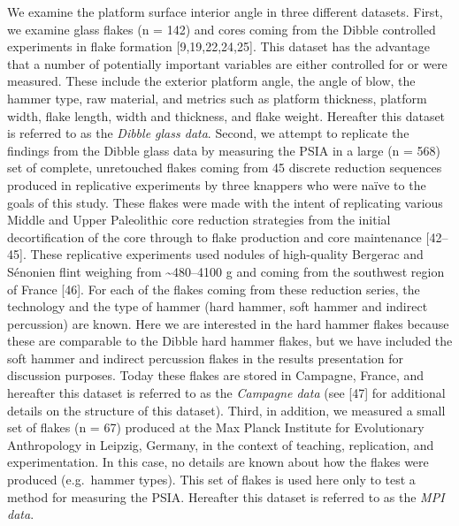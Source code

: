 \documentclass[10pt,letterpaper]{article}
\begin{document}
We examine the platform surface interior angle in three different
datasets. First, we examine glass flakes (n = 142) and cores coming from
the Dibble controlled experiments in flake formation
{[}9,19,22,24,25{]}. This dataset has the advantage that a number of
potentially important variables are either controlled for or were
measured. These include the exterior platform angle, the angle of blow,
the hammer type, raw material, and metrics such as platform thickness,
platform width, flake length, width and thickness, and flake weight.
Hereafter this dataset is referred to as the \emph{Dibble glass data}.
Second, we attempt to replicate the findings from the Dibble glass data
by measuring the PSIA in a large (n = 568) set of complete, unretouched
flakes coming from 45 discrete reduction sequences produced in
replicative experiments by three knappers who were naïve to the goals of
this study. These flakes were made with the intent of replicating
various Middle and Upper Paleolithic core reduction strategies from the
initial decortification of the core through to flake production and core
maintenance {[}42--45{]}. These replicative experiments used nodules of
high-quality Bergerac and Sénonien flint weighing from
\textasciitilde480--4100 g and coming from the southwest region of
France {[}46{]}. For each of the flakes coming from these reduction
series, the technology and the type of hammer (hard hammer, soft hammer
and indirect percussion) are known. Here we are interested in the hard
hammer flakes because these are comparable to the Dibble hard hammer
flakes, but we have included the soft hammer and indirect percussion
flakes in the results presentation for discussion purposes. Today these
flakes are stored in Campagne, France, and hereafter this dataset is
referred to as the \emph{Campagne data} (see {[}47{]} for additional
details on the structure of this dataset). Third, in addition, we
measured a small set of flakes (n = 67) produced at the Max Planck
Institute for Evolutionary Anthropology in Leipzig, Germany, in the
context of teaching, replication, and experimentation. In this case, no
details are known about how the flakes were produced (e.g.~hammer
types). This set of flakes is used here only to test a method for
measuring the PSIA. Hereafter this dataset is referred to as the
\emph{MPI data}.
\end{document}
